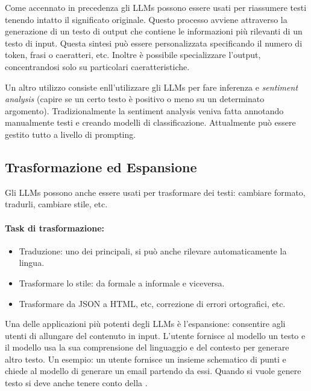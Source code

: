 Come accennato in precedenza gli LLMs possono essere usati per riassumere testi tenendo intatto il significato originale. Questo processo avviene attraverso la generazione di un testo di output che contiene le informazioni più rilevanti di un testo di input. Questa sintesi può essere personalizzata specificando il numero di token, frasi o caeratteri, etc. Inoltre è possibile specializzare l'output, concentrandosi solo su particolari caeratteristiche. 

Un altro utilizzo consiste enll'utilizzare gli LLMs per fare inferenza e \textit{sentiment analysis} (capire se un certo testo è positivo o meno su un determinato argomento).  Tradizionalmente la sentiment analysis veniva fatta annotando manualmente testi e creando modelli di classificazione. Attualmente può essere gestito tutto a livello di prompting.


\subsection{Trasformazione ed Espansione}

Gli LLMs possono anche essere usati per trasformare dei testi: cambiare formato, tradurli, cambiare stile, etc. 

\paragraph{Task di trasformazione:}

\begin{itemize}
  \item Traduzione: uno dei principali, si può anche rilevare automaticamente la lingua. 
  \item Trasformare lo stile: da formale a informale e viceversa. 
  \item Trasformare da JSON a HTML, etc, correzione di errori ortografici, etc.
\end{itemize}

Una delle applicazioni più potenti degli LLMs è l'espansione: consentire agli utenti di allungare del contenuto in input. L'utente fornisce al modello un testo e il modello usa la sua comprensione del linguaggio e del contesto per generare altro testo. Un esempio: un utente fornisce un insieme schematico di punti e chiede al modello di generare un email partendo da essi. Quando si vuole genere testo si deve anche tenere conto della . 

